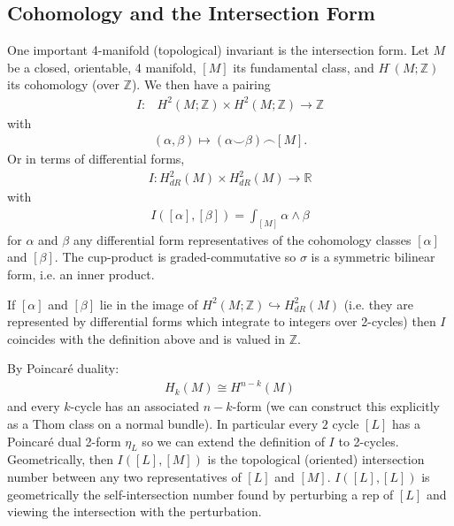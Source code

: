 \documentclass[12pt, onecolumn]{article}
\newenvironment{remark}[1][Remark]{\begin{trivlist}
\item[\hskip \labelsep {\bfseries #1}]}{\end{trivlist}}
\begin{document}
\subsection{Cohomology and the Intersection Form}
One important 4-manifold (topological) invariant is the intersection form.  Let $M$ be a closed, orientable, 4 manifold, $[M]$ its fundamental class, and $H^{\cdot}(M;\mathbb{Z})$ its cohomology (over $\mathbb{Z}$).  We then have a pairing
\begin{align*}
I:&  H^{2}(M;\mathbb{Z}) \times H^{2}(M; \mathbb{Z}) \rightarrow \mathbb{Z}
\end{align*}
with
\begin{align*}
(\alpha ,\beta) \mapsto (\alpha \smile \beta)\frown [M].
\end{align*}
Or in terms of differential forms,
\begin{align*}
I: H^{2}_{dR}(M) \times H^{2}_{dR}(M) \rightarrow \mathbb{R}
\end{align*}
with
\begin{align*}
I([\alpha],[\beta])=\int_{[M]}\alpha \wedge \beta
\end{align*}
for $\alpha$ and $\beta$ any differential form representatives of the cohomology classes $[\alpha]$ and $[\beta]$.  The cup-product is graded-commutative so $\sigma$ is a symmetric bilinear form, i.e. an inner product.


\begin{remark}
If $[\alpha]$ and $[\beta]$ lie in the image of $H^{2}(M;\mathbb{Z}) \hookrightarrow H^{2}_{dR}(M)$ (i.e. they are represented by differential forms which integrate to integers over 2-cycles) then $I$ coincides with the definition above and is valued in $\mathbb{Z}$.
\end{remark}

\begin{remark}
By Poincar\'{e} duality:
\begin{align*}
H_{k}(M) \cong H^{n-k}(M)
\end{align*}
and every $k$-cycle has an associated $n-k$-form (we can construct this explicitly as a Thom class on a normal bundle).  In particular every $2$ cycle $[L]$ has a Poincar\'{e} dual 2-form $\eta_{L}$ so we can extend the definition of $I$ to 2-cycles.  Geometrically, then $I([L],[M])$ is the topological (oriented) intersection number between any two representatives of $[L]$ and $[M]$.  $I([L],[L])$ is geometrically the self-intersection number found by perturbing a rep of $[L]$ and viewing the intersection with the perturbation.
\end{remark}
\end{document}
